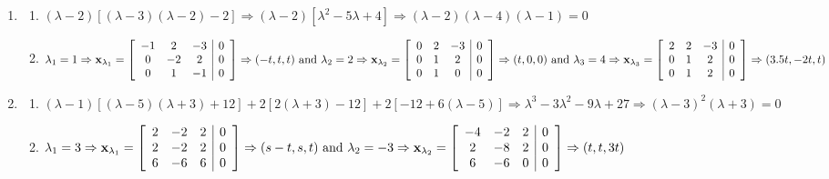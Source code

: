 \documentclass[12pt]{article}
\begin{document}
\begin{enumerate}
\begin{enumerate}
    \end{enumerate}

    \setcounter{enumi}{20}

  \item

    \begin{enumerate}

      \item $(\lambda-2)\left[ (\lambda-3)(\lambda-2)-2 \right]\Rightarrow (\lambda-2)\left[ \lambda^2-5\lambda+4 \right]\Rightarrow (\lambda-2)(\lambda-4)(\lambda-1)=0$

      \item $\lambda_1=1\Rightarrow \bold{x}_{\lambda_1}=\left[ \begin{array}{ccc|c} -1 & 2 & -3 & 0\\ 0 & -2 & 2 & 0\\ 0 & 1 & -1 & 0   \end{array} \right]\Rightarrow (-t,t,t)\text{ and }\lambda_2=2\Rightarrow \bold{x}_{\lambda_2}=\left[ \begin{array}{ccc|c} 0 & 2 & -3 & 0\\ 0 & 1 & 2 & 0\\ 0 & 1 & 0 & 0 \end{array} \right]\Rightarrow (t,0,0)\text{ and }\lambda_3=4\Rightarrow \bold{x}_{\lambda_3}=\left[ \begin{array}{ccc|c} 2 & 2 & -3 & 0\\ 0 & 1 & 2 & 0\\ 0 & 1 & 2 & 0   \end{array} \right]\Rightarrow (3.5t,-2t,t)$

    \end{enumerate}

    \setcounter{enumi}{22}

  \item 

    \begin{enumerate}

      \item $(\lambda-1)\left[ (\lambda-5)(\lambda+3)+12 \right]+2\left[ 2(\lambda+3)-12 \right]+2\left[ -12+6(\lambda-5) \right]\Rightarrow \lambda^3-3\lambda^2-9\lambda+27\Rightarrow (\lambda-3)^2(\lambda+3)=0$

      \item $\lambda_1=3\Rightarrow \bold{x}_{\lambda_1}=\left[ \begin{array}{ccc|c} 2 & -2 & 2 & 0\\ 2 & -2 & 2 & 0\\ 6 & -6 & 6 & 0   \end{array} \right]\Rightarrow (s-t,s,t)\text{ and }\lambda_2=-3\Rightarrow \bold{x}_{\lambda_2}=\left[ \begin{array}{ccc|c} -4 & -2 & 2 & 0\\ 2 & -8 & 2 & 0\\ 6 & -6 & 0 & 0 \end{array} \right]\Rightarrow (t,t,3t)$


\end{enumerate}
\end{enumerate}
\end{document}
